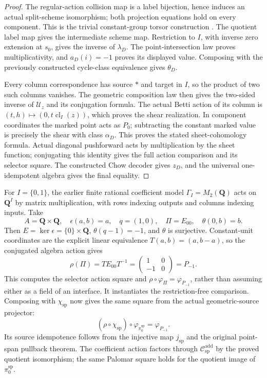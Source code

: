 \documentclass[11pt]{article}
\theoremstyle{definition}
\theoremstyle{remark}
\newcommand{\Q}{\mathbf Q}
\begin{document}
\begin{proof}
The regular-action collision map is a label bijection, hence induces an
actual split-scheme isomorphism; both projection equations hold on every
component.  This is the trivial constant-group torsor construction
\cite{StacksPseudoTorsor,StacksTorsorDefinition}.
The quotient label map gives the intermediate scheme map.  Restriction
to \(I\), with inverse zero extension at \(s_0\), gives the inverse of
\(\lambda_D\).  The point-intersection law proves multiplicativity, and
\(a_D(i)=-1\) proves its displayed value.  Composing with the previously
constructed cycle-class equivalence gives \(\theta_D\).

Every column correspondence has source \(*\) and target in \(I\), so
the product of two such columns vanishes.  The geometric composition law
then gives the two-sided inverse of \(\mathcal U_z\) and its conjugation
formula.  The actual Betti action of its column is
\((t,h)\mapsto(0,t\operatorname{cl}_I(z))\), which proves the shear
realization.  In component coordinates the marked point acts as
\(P_0\); subtracting the constant marked value is precisely the shear
with class \(\alpha_D\).  This proves the stated sheet-cohomology
formula.  Actual diagonal pushforward acts by multiplication by the sheet
function; conjugating this identity gives the full action comparison and
its selector square.  The constructed Chow decoder gives \(z_D\),
and the universal one-idempotent algebra gives the final equality.
\end{proof}

For \(I=\{0,1\}\), the earlier finite rational coefficient
model \(\Gamma_I=M_2(\Q)\) acts on \(\Q^I\) by matrix multiplication,
with rows indexing outputs and columns indexing inputs.  Take
\[
  A=\Q\times\Q,\quad \epsilon(a,b)=a,\quad q=(1,0),\quad
  \Pi=E_{00},\quad \theta(0,b)=b.
\]
Then \(E=\ker\epsilon=\{0\}\times\Q\),
\(\theta(q-1)=-1\), and \(\theta\) is surjective.  Constant-unit
coordinates are the explicit linear equivalence
\(T(a,b)=(a,b-a)\), so the conjugated algebra action gives
\[
  \rho(\Pi)=T E_{00}T^{-1}
    =\begin{pmatrix}1&0\\-1&0\end{pmatrix}=P_{-1}.
\]
This computes the selector action square and
\(\rho\circ\varphi_\Pi=\varphi_{P_{-1}}\), rather than assuming either
as a field of an interface.  It instantiates the restriction-free comparison.
Composing with \(\chi_{\mathrm{sp}}\) now gives the same square from the
actual geometric-source projector:
\[
  (\rho\circ\chi_{\mathrm{sp}})\circ\varphi_{\pi_0^{\mathrm{sp}}}
    =\varphi_{P_{-1}}.
\]
Its source idempotence follows from the injective map
\(j_{\mathrm{sp}}\) and the original point-span pullback theorem.
The coefficient action factors through
\(\mathcal C_{\mathrm{sp}}^{\mathrm{add}}\) by the proved quotient
isomorphism; the same Palomar square holds for the quotient image of
\(\pi_0^{\mathrm{sp}}\).
\end{document}
